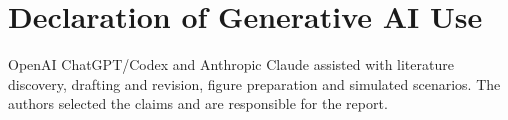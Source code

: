\documentclass[sigconf,nonacm,balance=false]{acmart}
\begin{document}
\section*{Declaration of Generative AI Use}
OpenAI ChatGPT/Codex and Anthropic Claude assisted with literature discovery, drafting and revision, figure preparation and simulated scenarios. The authors selected the claims and are responsible for the report.
\end{document}
